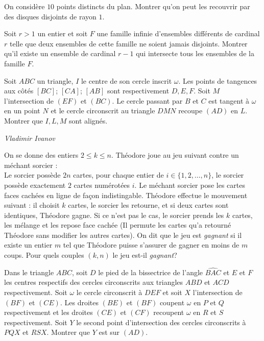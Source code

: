 \begin{exo}{}
On considère $10$ points distincts du plan. Montrer qu'on peut les recouvrir par des disques disjoints de rayon $1$.
\end{exo}

\begin{exo}{}
Soit $r>1$ un entier et soit $F$ une famille infinie d'ensembles différents de cardinal $r$ telle que deux ensembles de cette famille ne soient jamais disjoints. Montrer qu'il existe un ensemble de cardinal $r-1$ qui intersecte tous les ensembles de la famille $F$.
\end{exo}


\begin{exo}{}
Soit $ABC$ un triangle, $I$ le centre de son cercle inscrit $\omega$. Les points de tangences
aux côtés $[BC]$; $[CA]$; $[AB]$ sont respectivement $D,E, F$. Soit $M$ l’intersection de $(EF)$ et $(BC)$.
Le cercle passant par $B$ et $C$ est tangent à $\omega$ en un point $N$ et le cercle circonscrit au triangle
$DMN$ recoupe $(AD)$ en $L$. Montrer que $I,L,M$ sont alignés.

\medskip
\textit{Vladimir Ivanov}
\end{exo}




\begin{exo}{}
On se donne des entiers $2\le k\le n$. Théodore joue au jeu suivant contre un méchant sorcier : \\
Le sorcier possède $2n$ cartes, pour chaque entier de $i\in \{1,2,\dots,n\}$, le sorcier possède exactement $2$ cartes numérotées $i$. Le méchant sorcier pose les cartes faces cachées en ligne de façon indistingable. Théodore effectue le mouvement suivant : il choisit $k$ cartes, le sorcier les retourne, et si deux cartes sont identiques, Théodore gagne. Si ce n'est pas le cas, le sorcier prends les $k$ cartes, les mélange et les repose face cachée (Il permute les cartes qu'a retourné Théodore sans modifier les autres cartes). On dit que le jeu est \textit{gagnant} si il existe un entier $m$ tel que Théodore puisse s'assurer de gagner en moins de $m$ coups. Pour quels couples $(k,n)$ le jeu est-il \textit{gagnant}?

\end{exo}

\begin{exo}{}
Dans le triangle $ABC$, soit $D$ le pied de la bissectrice de l'angle $\widehat{BAC}$ et $E$ et $F$ les centres respectifs des cercles circonscrits aux triangles $ABD$ et $ACD$ respectivement. Soit $\omega$ le cercle circonscrit à $DEF$ et soit $X$ l'intersection de $(BF)$ et $(CE)$. Les droites $(BE)$ et $(BF)$ coupent $\omega$ en $P$ et $Q$ respectivement et les droites $(CE)$ et $(CF)$ recoupent $\omega$ en $R$ et $S$ respectivement. Soit $Y$ le second point d'intersection des cercles circonscrits à $PQX$ et $RSX$. Montrer que $Y$ est sur $(AD)$.
\end{exo}

